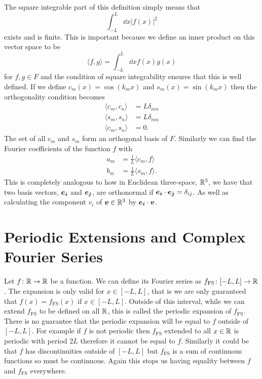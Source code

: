 \documentclass[a4paper]{article}
\renewcommand{\innerproduct}[2]{\langle {#1} , {#2} \rangle}
\newcommand{\FS}{{\mathrm{FS}}}
\begin{document}
    The square integrable part of this definition simply means that
    \[\int_{-L}^{L} \dd{x} |f(x)|^2\]
    exists and is finite.
    This is important because we define an inner product on this vector space to be
    \[\innerproduct{f}{g} = \int_{-L}^{L} \dd{x} f(x)g(x)\]
    for \(f, g\in F\) and the condition of square integrability ensures that this is well defined.
    If we define \(c_m(x) = \cos(k_mx)\) and \(s_m(x) = \sin(k_mx)\) then the orthogonality condition becomes
    \begin{align*}
        \innerproduct{c_m}{c_n} &= L\delta_{mn}\\
        \innerproduct{s_m}{s_n} &= L\delta_{mn}\\
        \innerproduct{c_m}{s_n} &= 0.
    \end{align*}
    The set of all \(c_m\) and \(s_m\) form an orthogonal basis of \(F\).
    Similarly we can find the Fourier coefficients of the function \(f\) with
    \begin{align*}
        a_m &= \frac{1}{L}\innerproduct{c_m}{f}\\
        b_m &= \frac{1}{L}\innerproduct{s_m}{f}.
    \end{align*}
    This is completely analogous to how in Euclidean three-space, \(\mathbb{R}^3\), we have that two basis vectors, \(\bm{e_{i}}\) and \(\bm{e_{j}}\), are orthonormal if \(\bm{e_{i}}\cdot\bm{e_{j}} = \delta_{ij}\).
    As well as calculating the component \(v_i\) of \(\bm{v}\in\mathbb{R}^3\) by \(\bm{e_{i}}\cdot\bm{v}\).
    
    \section{Periodic Extensions and Complex Fourier Series}
    Let \(f\colon\mathbb{R}\to\mathbb{R}\) be a function.
    We can define its Fourier series as \(f_\FS\colon[-L, L]\to\reals\).
    The expansion is only valid for \(x\in[-L, L]\), that is we are only guaranteed that \(f(x) = f_\FS(x)\) if \(x\in[-L, L]\).
    Outside of this interval, while we can extend \(f_\FS\) to be defined on all \(\mathbb{R}\), this is called the periodic expansion of \(f_\FS\).
    There is no guarantee that the periodic expansion will be equal to \(f\) outside of \([-L, L]\).
    For example if \(f\) is not periodic then \(f_\FS\) extended to all \(x\in\mathbb{R}\) is periodic with period \(2L\) therefore it cannot be equal to \(f\).
    Similarly it could be that \(f\) has discontinuities outside of \([-L, L]\) but \(f_\FS\) is a sum of continuous functions so must be continuous.
    Again this stops us having equality between \(f\) and \(f_\FS\) everywhere.
    
\end{document}

